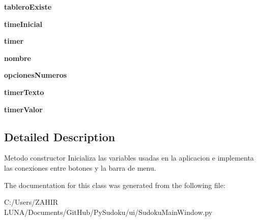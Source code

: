 \begin{DoxyCompactItemize}
\item 
\hypertarget{class_sudoku_main_window_1_1_sudoku_main_window_a549e0432a4386a67cb4ee4d3741c0835}{{\bfseries tablero\-Existe}}\label{class_sudoku_main_window_1_1_sudoku_main_window_a549e0432a4386a67cb4ee4d3741c0835}

\item 
\hypertarget{class_sudoku_main_window_1_1_sudoku_main_window_ade06c7abd46ed3d4385ebf0e01b670b1}{{\bfseries time\-Inicial}}\label{class_sudoku_main_window_1_1_sudoku_main_window_ade06c7abd46ed3d4385ebf0e01b670b1}

\item 
\hypertarget{class_sudoku_main_window_1_1_sudoku_main_window_ace319036ada7a045ab675ff38fa8ddb1}{{\bfseries timer}}\label{class_sudoku_main_window_1_1_sudoku_main_window_ace319036ada7a045ab675ff38fa8ddb1}

\item 
\hypertarget{class_sudoku_main_window_1_1_sudoku_main_window_ae9b4ab2489626295aa20808e8ffeeeca}{{\bfseries nombre}}\label{class_sudoku_main_window_1_1_sudoku_main_window_ae9b4ab2489626295aa20808e8ffeeeca}

\item 
\hypertarget{class_sudoku_main_window_1_1_sudoku_main_window_a370ea64e9453cab45cf57647f8ce6cf9}{{\bfseries opciones\-Numeros}}\label{class_sudoku_main_window_1_1_sudoku_main_window_a370ea64e9453cab45cf57647f8ce6cf9}

\item 
\hypertarget{class_sudoku_main_window_1_1_sudoku_main_window_a252168ae5d3f829d9403336f3c8893a3}{{\bfseries timer\-Texto}}\label{class_sudoku_main_window_1_1_sudoku_main_window_a252168ae5d3f829d9403336f3c8893a3}

\item 
\hypertarget{class_sudoku_main_window_1_1_sudoku_main_window_af4af3149f7ab37219efac57129609402}{{\bfseries timer\-Valor}}\label{class_sudoku_main_window_1_1_sudoku_main_window_af4af3149f7ab37219efac57129609402}

\end{DoxyCompactItemize}


\subsection{Detailed Description}
\begin{DoxyVerb}Metodo constructor
  Inicializa las variables usadas en la aplicacion e implementa las conexiones entre botones
  y la barra de menu.
\end{DoxyVerb}
 

The documentation for this class was generated from the following file\-:\begin{DoxyCompactItemize}
\item 
C\-:/\-Users/\-Z\-A\-H\-I\-R  L\-U\-N\-A/\-Documents/\-Git\-Hub/\-Py\-Sudoku/ui/Sudoku\-Main\-Window.\-py\end{DoxyCompactItemize}
